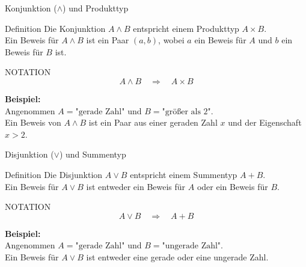 \documentclass{beamer}
\begin{document}
\begin{frame}{Konjunktion (\(\wedge\)) und Produkttyp}
    \begin{block}{Definition}
        Die Konjunktion \( A \wedge B \) entspricht einem Produkttyp \( A \times B \). \\
        Ein Beweis für \( A \wedge B \) ist ein Paar \((a, b)\), wobei \( a \) ein Beweis für \( A \) und \( b \) ein Beweis für \( B \) ist.
    \end{block}

    \begin{block}{NOTATION}
        \[
        A \wedge B \quad \Rightarrow \quad A \times B
        \]
    \end{block}
    
    \textbf{Beispiel:} \\
    Angenommen \( A = \text{"gerade Zahl"} \) und \( B = \text{"größer als 2"} \). \\
    Ein Beweis von \( A \wedge B \) ist ein Paar aus einer geraden Zahl \( x \) und der Eigenschaft \( x > 2 \).
\end{frame}

\begin{frame}{Disjunktion (\(\vee\)) und Summentyp}
    \begin{block}{Definition}
        Die Disjunktion \( A \vee B \) entspricht einem Summentyp \( A + B \). \\
        Ein Beweis für \( A \vee B \) ist entweder ein Beweis für \( A \) oder ein Beweis für \( B \).
    \end{block}

    \begin{block}{NOTATION}
        \[
        A \vee B \quad \Rightarrow \quad A + B
        \]
    \end{block}

    \textbf{Beispiel:} \\
    Angenommen \( A = \text{"gerade Zahl"} \) und \( B = \text{"ungerade Zahl"} \). \\
    Ein Beweis für \( A \vee B \) ist entweder eine gerade oder eine ungerade Zahl.
\end{frame}
\end{document}
